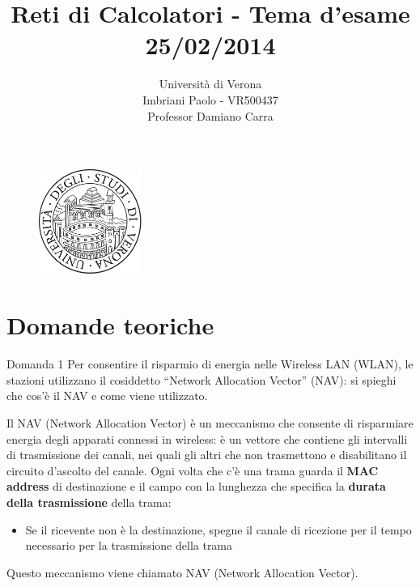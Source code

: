 \documentclass[a4paper]{article}
\title{Reti di Calcolatori - Tema d'esame 25/02/2014}
\author{Università di Verona\\Imbriani Paolo - VR500437\\Professor Damiano Carra}
\begin{document}
\begin{figure}
    \centering
    \includegraphics[width=0.3\textwidth]{UniversityofVerona.png}
    \label{fig:centered-image}
\end{figure}

\maketitle 

\pagebreak

\section{Domande teoriche}

\begin{examplebox}{Domanda 1}
Per consentire il risparmio di energia nelle Wireless LAN (WLAN), le stazioni utilizzano il cosiddetto
“Network Allocation Vector” (NAV): si spieghi che cos’è il NAV e come viene utilizzato.
\end{examplebox}
\noindent
Il NAV (Network Allocation Vector) è un meccanismo che consente di risparmiare energia 
degli apparati connessi in wireless: è un vettore che contiene gli intervalli di trasmissione dei canali, 
nei quali gli altri che non trasmettono e disabilitano il circuito d’ascolto del canale.
Ogni volta che c’è una trama guarda il \textbf{MAC address} di destinazione e 
il campo con la lunghezza che specifica la \textbf{durata della trasmissione} della trama:
\begin{itemize}
    \item Se il ricevente non è la destinazione, spegne il canale di ricezione per il tempo
    necessario per la trasmissione della trama
\end{itemize}
Questo meccanismo viene chiamato NAV (Network Allocation Vector).
\end{document}
